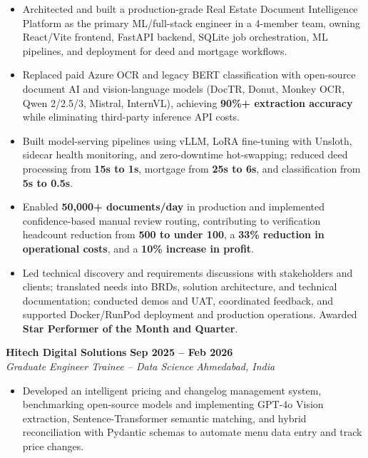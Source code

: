 \documentclass[10pt,a4paper]{extarticle}
\newcommand{\experience}[4]{%
  \textbf{#1} \hfill \textbf{#2}\\[-1pt]
  \textit{#3} \hfill \textit{#4}\\[-4pt]
}
\begin{document}
\begin{itemize}
  \item Architected and built a production-grade Real Estate Document Intelligence Platform as the primary ML/full-stack engineer in a 4-member team, owning React/Vite frontend, FastAPI backend, SQLite job orchestration, ML pipelines, and deployment for deed and mortgage workflows.

  \item Replaced paid Azure OCR and legacy BERT classification with open-source document AI and vision-language models (DocTR, Donut, Monkey OCR, Qwen 2/2.5/3, Mistral, InternVL), achieving \textbf{90\%+ extraction accuracy} while eliminating third-party inference API costs.

  \item Built model-serving pipelines using vLLM, LoRA fine-tuning with Unsloth, sidecar health monitoring, and zero-downtime hot-swapping; reduced deed processing from \textbf{15s to 1s}, mortgage from \textbf{25s to 6s}, and classification from \textbf{5s to 0.5s}.

  \item Enabled \textbf{50,000+ documents/day} in production and implemented confidence-based manual review routing, contributing to verification headcount reduction from \textbf{500 to under 100}, a \textbf{33\% reduction in operational costs}, and a \textbf{10\% increase in profit}.

  \item Led technical discovery and requirements discussions with stakeholders and clients; translated needs into BRDs, solution architecture, and technical documentation; conducted demos and UAT, coordinated feedback, and supported Docker/RunPod deployment and production operations. Awarded \textbf{Star Performer of the Month and Quarter}.
\end{itemize}

\vspace{3pt}

\experience
{Hitech Digital Solutions}
{Sep 2025 -- Feb 2026}
{Graduate Engineer Trainee -- Data Science}
{Ahmedabad, India}

\begin{itemize}
  \item Developed an intelligent pricing and changelog management system, benchmarking open-source models and implementing GPT-4o Vision extraction, Sentence-Transformer semantic matching, and hybrid reconciliation with Pydantic schemas to automate menu data entry and track price changes.
\end{itemize}
\end{document}
